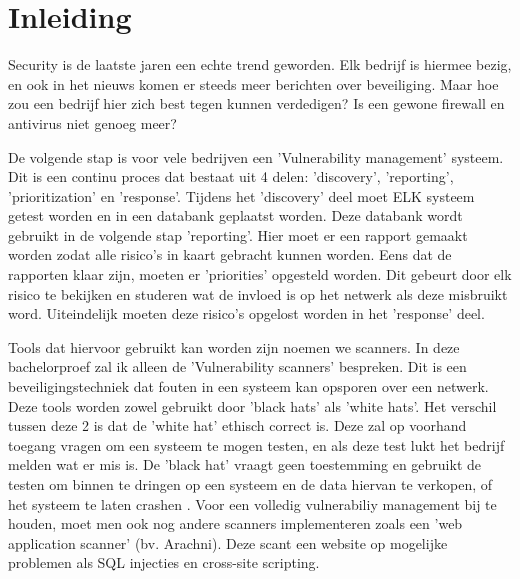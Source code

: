 
\chapter{Inleiding}
\label{ch:inleiding}

Security is de laatste jaren een echte trend geworden. Elk bedrijf is hiermee bezig, en ook in het nieuws komen er steeds meer berichten over beveiliging. Maar hoe zou een bedrijf hier zich best tegen kunnen verdedigen? Is een gewone firewall en antivirus niet genoeg meer?


De volgende stap is voor vele bedrijven een 'Vulnerability management' systeem. Dit is een continu proces dat bestaat uit 4 delen:  'discovery', 'reporting', 'prioritization' en 'response'. Tijdens het 'discovery' deel moet ELK systeem getest worden en in een databank geplaatst worden. Deze databank wordt gebruikt in de volgende stap 'reporting'. Hier moet er een rapport gemaakt worden zodat alle risico's in kaart gebracht kunnen worden. Eens dat de rapporten klaar zijn, moeten er 'priorities' opgesteld worden. Dit gebeurt door elk risico te bekijken en studeren wat de invloed is op het netwerk als deze misbruikt word. Uiteindelijk moeten deze risico's opgelost worden in het 'response' deel. \textcite{Tripwire}

Tools dat hiervoor gebruikt kan worden zijn noemen we scanners. In deze bachelorproef zal ik alleen de 'Vulnerability scanners' bespreken. Dit is een beveiligingstechniek  dat fouten in een systeem kan opsporen \textcite{Techopedia} over een netwerk. Deze tools worden zowel gebruikt door 'black hats' als 'white hats'. Het verschil tussen deze 2 is dat de 'white hat' ethisch correct is. Deze zal op voorhand toegang vragen om een systeem te mogen testen, en als deze test lukt het bedrijf melden wat er mis is. De 'black hat' vraagt geen toestemming en gebruikt de testen om binnen te dringen op een systeem en de data hiervan te verkopen, of het systeem te laten crashen \textcite{Howtogeek}. Voor een volledig vulnerabiliy management bij te houden, moet men ook nog andere scanners implementeren zoals een 'web application scanner' (bv. Arachni). Deze scant een website op mogelijke problemen als SQL injecties en cross-site scripting.

